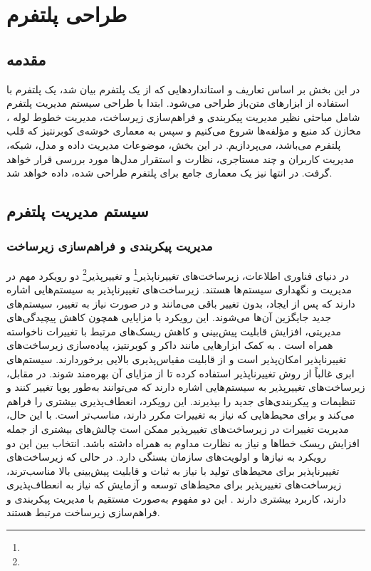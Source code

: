 \chapter{طراحی پلتفرم }
 
\section{مقدمه}
در این بخش بر اساس تعاریف و استانداردهایی که از یک پلتفرم  بیان شد، یک پلتفرم  با استفاده از ابزارهای متن‌باز طراحی می‌شود. ابتدا با طراحی سیستم مدیریت پلتفرم شامل مباحثی نظیر مدیریت پیکربندی و فراهم‌سازی زیرساخت، مدیریت خطوط لوله ، مخازن کد منبع و مؤلفه‌ها شروع می‌کنیم و سپس به معماری خوشه‌ی کوبرنتیز که قلب پلتفرم می‌باشد، می‌پردازیم. در این بخش، موضوعات مدیریت داده و مدل، شبکه، مدیریت کاربران و چند مستاجری، نظارت و استقرار مدل‌ها مورد بررسی قرار خواهد گرفت. در انتها نیز یک معماری جامع برای پلتفرم طراحی شده، داده خواهد شد.

\section{سیستم مدیریت پلتفرم}
\subsection{مدیریت پیکربندی و فراهم‌سازی زیرساخت}
در دنیای فناوری اطلاعات، زیرساخت‌های تغییرناپذیر\footnote{} و تغییرپذیر\footnote{} دو رویکرد مهم در مدیریت و نگهداری سیستم‌ها هستند. زیرساخت‌های تغییرناپذیر به سیستم‌هایی اشاره دارند که پس از ایجاد، بدون تغییر باقی می‌مانند و در صورت نیاز به تغییر، سیستم‌های جدید جایگزین آن‌ها می‌شوند. این رویکرد با مزایایی همچون کاهش پیچیدگی‌های مدیریتی، افزایش قابلیت پیش‌بینی و کاهش ریسک‌های مرتبط با تغییرات ناخواسته همراه است \cite{DevopsIaac2}. به کمک ابزارهایی مانند داکر و کوبرنتیز، پیاده‌سازی زیرساخت‌های تغییرناپذیر امکان‌پذیر است و از قابلیت مقیاس‌پذیری بالایی برخوردارند. سیستم‌های ابری غالباً از روش تغییرناپذیر استفاده کرده تا از مزایای آن بهره‌مند شوند. در مقابل، زیرساخت‌های تغییرپذیر به سیستم‌هایی اشاره دارند که می‌توانند به‌طور پویا تغییر کنند و تنظیمات و پیکربندی‌های جدید را بپذیرند. این رویکرد، انعطاف‌پذیری بیشتری را فراهم می‌کند و برای محیط‌هایی که نیاز به تغییرات مکرر دارند، مناسب‌تر است. با این حال، مدیریت تغییرات در زیرساخت‌های تغییرپذیر ممکن است چالش‌های بیشتری از جمله افزایش ریسک خطاها و نیاز به نظارت مداوم به همراه داشته باشد. انتخاب بین این دو رویکرد به نیازها و اولویت‌های سازمان بستگی دارد. در حالی که زیرساخت‌های تغییرناپذیر برای محیط‌های تولید با نیاز به ثبات و قابلیت پیش‌بینی بالا مناسب‌ترند، زیرساخت‌های تغییرپذیر برای محیط‌های توسعه و آزمایش که نیاز به انعطاف‌پذیری دارند، کاربرد بیشتری دارند \cite{DevopsIaac1}. این دو مفهوم به‌صورت مستقیم با مدیریت پیکربندی و فراهم‌سازی زیرساخت مرتبط هستند.

